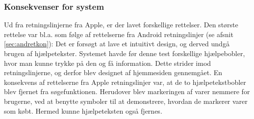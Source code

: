 \subsubsection{Konsekvenser for system}
Ud fra retningslinjerne fra Apple, er der lavet forskellige rettelser. Den største rettelse var bl.a. som følge af rettelserne fra Android retningslinjer (se afsnit \ref{sec:andretkon}): Det er forsøgt at lave et intuitivt design, og derved undgå brugen af hjælpetekster. Systemet havde før denne test forskellige hjælpebobler, hvor man kunne trykke på den og få information. Dette strider imod retningslinjerne, og derfor blev designet af hjemmesiden gennemgået. En konsekvens af rettelserne fra Apple retningslinjer var, at de to hjælpetekstbobler blev fjernet fra søgefunktionen. Herudover blev markeringen af varer nemmere for brugerne, ved at benytte symboler til at demonstrere, hvordan de markerer varer som købt. Hermed kunne hjælpeteksten også fjernes.